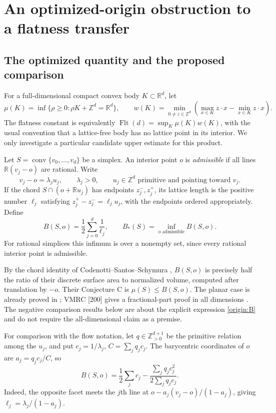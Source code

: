\documentclass[11pt,a4paper]{article}
\theoremstyle{remark}\newtheorem{remark}[theorem]{Remark}
\DeclareMathOperator{\conv}{conv}
\DeclareMathOperator{\Flt}{Flt}
\newcommand{\R}{\mathbb R}\newcommand{\Z}{\mathbb Z}\newcommand{\Q}{\mathbb Q}
\newcommand{\Bopt}{B_*}
\begin{document}
\section{An optimized-origin obstruction to a flatness transfer}
\label{r3:flatness}

\subsection{The optimized quantity and the proposed comparison}

For a full-dimensional compact convex body $K\subset\R^d$, let
\[
 \mu(K)=\inf\{\rho\ge0:\rho K+\Z^d=\R^d\},\qquad
 w(K)=\min_{0\ne z\in\Z^d}
      \left(\max_{x\in K}z\cdot x-\min_{x\in K}z\cdot x\right).
\]
The flatness constant is equivalently
$\Flt(d)=\sup_K\mu(K)w(K)$, with the usual convention that a
lattice-free body has no lattice point in its interior. We only
investigate a particular candidate upper estimate for this product.

Let $S=\conv\{v_0,\ldots,v_d\}$ be a simplex. An interior point
$o$ is \emph{admissible} if all lines $\R(v_j-o)$ are rational.
Write
\[
 v_j-o=\lambda_j u_j,
 \qquad \lambda_j>0,
 \qquad u_j\in\Z^d\text{ primitive and pointing toward }v_j.
\]
If the chord $S\cap(o+\R u_j)$ has endpoints $z_j^-,z_j^+$,
its lattice length is the positive number $\ell_j$ satisfying
$z_j^+-z_j^-=\ell_j u_j$, with the endpoints ordered appropriately.
Define
\begin{equation}\label{origin:B}
 B(S,o)=\frac12\sum_{j=0}^d\frac1{\ell_j},\qquad
 \Bopt(S)=\inf_{o\text{ admissible}}B(S,o).
\end{equation}
For rational simplices this infimum is over a nonempty set, since
every rational interior point is admissible.

By the chord identity of Codenotti--Santos--Schymura
\cite[Lemma 4.1]{CSS}, $B(S,o)$ is precisely half the ratio of their
discrete surface area to normalized volume, computed after
translation by $-o$. Their Conjecture C is $\mu(S)\le B(S,o)$.
The planar case is already proved in \cite[Corollary 4.11]{CSS};
VMRC [200] gives a fractional-part proof in all dimensions
\cite{VMRC200}. The negative comparison results below are about
the explicit expression \eqref{origin:B} and do not require the
all-dimensional claim as a premise.

For comparison with the flow notation, let $q\in\Z_{>0}^{d+1}$
be the primitive relation among the $u_j$, and put
$c_j=1/\lambda_j$, $C=\sum_jq_jc_j$. The barycentric coordinates
of $o$ are $a_j=q_jc_j/C$, so
\begin{equation}\label{origin:flowB}
 B(S,o)=\frac12\sum_jc_j-
               \frac{\sum_jq_jc_j^2}{2\sum_jq_jc_j}.
\end{equation}
Indeed, the opposite facet meets the $j$th line at
$o-a_j(v_j-o)/(1-a_j)$, giving
$\ell_j=\lambda_j/(1-a_j)$.
\end{document}

